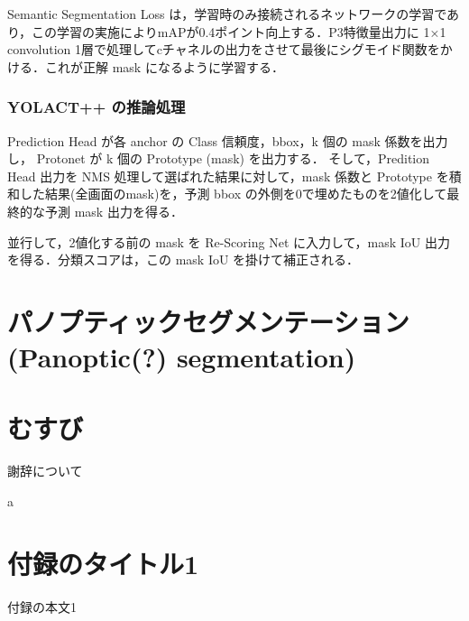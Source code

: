 \documentclass[originalpaper]{jsaiart}     %
\begin{document}
Semantic Segmentation Loss は，学習時のみ接続されるネットワークの学習であり，この学習の実施によりmAPが0.4ポイント向上する．P3特徴量出力に 1×1 convolution 1層で処理してcチャネルの出力をさせて最後にシグモイド関数をかける．これが正解 mask になるように学習する．

\subsubsection{YOLACT++ の推論処理}
Prediction Head が各 anchor の Class 信頼度，bbox，k 個の mask 係数を出力し，
Protonet が k 個の Prototype (mask) を出力する．
そして，Predition Head 出力を NMS 処理して選ばれた結果に対して，mask 係数と Prototype を積和した結果(全画面のmask)を，予測 bbox の外側を0で埋めたものを2値化して最終的な予測 mask 出力を得る．

並行して，2値化する前の mask を Re-Scoring Net に入力して，mask IoU 出力を得る．分類スコアは，この mask IoU を掛けて補正される．
\section{パノプティックセグメンテーション(Panoptic(?) segmentation)}
\section{むすび}

\begin{acknowledgment}
謝辞について
\end{acknowledgment}a

%



\appendix

\section{付録のタイトル1}
付録の本文1

\begin{biography}
\end{biography}
\end{document}
